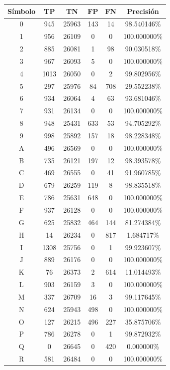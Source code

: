 \documentclass[a4paper, 11pt, oneside]{report}
\begin{document}
\begin{table}
\centering
\begin{tabular}{|c|c|c|c|c|c|}
	\hline
	Símbolo & TP & TN & FP & FN & Precisión \\ 
	\hline
	0 & 945 & 25963 & 143 & 14 & 98.540146\% \\ 
	1 & 956 & 26109 & 0 & 0 & 100.000000\% \\ 
	2 & 885 & 26081 & 1 & 98 & 90.030518\% \\ 
	3 & 967 & 26093 & 5 & 0 & 100.000000\% \\ 
	4 & 1013 & 26050 & 0 & 2 & 99.802956\% \\ 
	5 & 297 & 25976 & 84 & 708 & 29.552238\% \\ 
	6 & 934 & 26064 & 4 & 63 & 93.681046\% \\ 
	7 & 931 & 26134 & 0 & 0 & 100.000000\% \\ 
	8 & 948 & 25431 & 633 & 53 & 94.705292\% \\ 
	9 & 998 & 25892 & 157 & 18 & 98.228348\% \\ 
	A & 496 & 26569 & 0 & 0 & 100.000000\% \\ 
	B & 735 & 26121 & 197 & 12 & 98.393578\% \\ 
	C & 469 & 26555 & 0 & 41 & 91.960785\% \\ 
	D & 679 & 26259 & 119 & 8 & 98.835518\% \\ 
	E & 786 & 25631 & 648 & 0 & 100.000000\% \\ 
	F & 937 & 26128 & 0 & 0 & 100.000000\% \\ 
	G & 625 & 25832 & 464 & 144 & 81.274384\% \\ 
	H & 14 & 26234 & 0 & 817 & 1.684717\% \\ 
	I & 1308 & 25756 & 0 & 1 & 99.923607\% \\ 
	J & 889 & 26176 & 0 & 0 & 100.000000\% \\ 
	K & 76 & 26373 & 2 & 614 & 11.014493\% \\ 
	L & 903 & 26159 & 3 & 0 & 100.000000\% \\ 
	M & 337 & 26709 & 16 & 3 & 99.117645\% \\ 
	N & 624 & 25943 & 498 & 0 & 100.000000\% \\ 
	O & 127 & 26215 & 496 & 227 & 35.875706\% \\ 
	P & 786 & 26278 & 0 & 1 & 99.872932\% \\ 
	Q & 0 & 26645 & 0 & 420 & 0.000000\% \\ 
	R & 581 & 26484 & 0 & 0 & 100.000000\% \\ 

\end{tabular}
\end{table}
\end{document}
